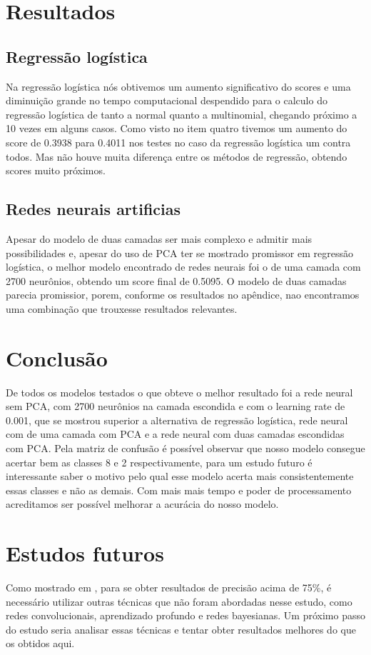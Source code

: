 \documentclass[conference]{IEEEtran}
\begin{document}
\section{Resultados}
  
\subsection{Regressão logística}
Na regressão logística nós obtivemos um aumento significativo do scores e uma diminuição
grande no tempo computacional despendido para o calculo do regressão logística de tanto a normal quanto a multinomial, chegando próximo a 10 vezes em alguns casos. Como visto no item quatro tivemos um aumento do score de 0.3938 para 0.4011 nos testes no caso da regressão logística um contra todos. Mas não houve muita diferença entre os métodos de regressão, obtendo scores muito próximos.

\subsection{Redes neurais artificias}
Apesar do modelo de duas camadas ser mais complexo e admitir mais possibilidades e, apesar do uso de PCA ter se mostrado promissor em regressão logística, o melhor modelo encontrado de redes neurais foi o de uma camada com 2700 neurônios, obtendo um score final de 0.5095. O modelo de duas camadas parecia promissior, porem, conforme os resultados no apêndice, nao encontramos uma combinação que trouxesse resultados relevantes.


\section{Conclusão}
De todos os modelos testados o que obteve o melhor resultado foi a rede neural sem PCA, com 2700 neurônios na camada escondida e com o learning rate de 0.001, que se mostrou superior a alternativa de regressão logística, rede neural com de uma camada com PCA e a rede neural com duas camadas escondidas com PCA. Pela matriz de confusão é possível observar que nosso modelo consegue acertar bem as classes 8 e 2 respectivamente, para um estudo futuro é interessante saber o motivo pelo qual esse modelo acerta mais consistentemente essas classes e não as demais. Com mais mais tempo e poder de processamento acreditamos ser possível melhorar a acurácia do nosso modelo.


\section{Estudos futuros}
Como mostrado em \cite{b15}, para se obter resultados de precisão acima de 75\%, é necessário utilizar outras técnicas que não foram abordadas nesse estudo, como redes convolucionais, aprendizado profundo e redes bayesianas. Um próximo passo do estudo seria analisar essas técnicas e tentar obter resultados melhores do que os obtidos aqui.	
\end{document}
